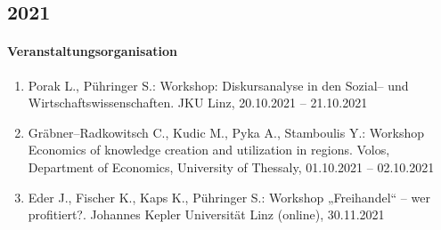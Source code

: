 \subsection*{2021}
\paragraph{Veranstaltungsorganisation}
\begin{enumerate}[leftmargin=*, labelsep=0.5cm]
\item Porak L., Pühringer S.: Workshop: Diskursanalyse in den Sozial-- und Wirtschaftswissenschaften. JKU Linz, 20.10.2021 -- 21.10.2021
\item Gräbner--Radkowitsch C., Kudic M., Pyka A., Stamboulis Y.: Workshop Economics of knowledge creation and utilization in regions. Volos, Department of Economics, University of Thessaly, 01.10.2021 -- 02.10.2021
\item Eder J., Fischer K., Kaps K., Pühringer S.: Workshop „Freihandel“ – wer profitiert?. Johannes Kepler Universität Linz (online), 30.11.2021
\end{enumerate}

